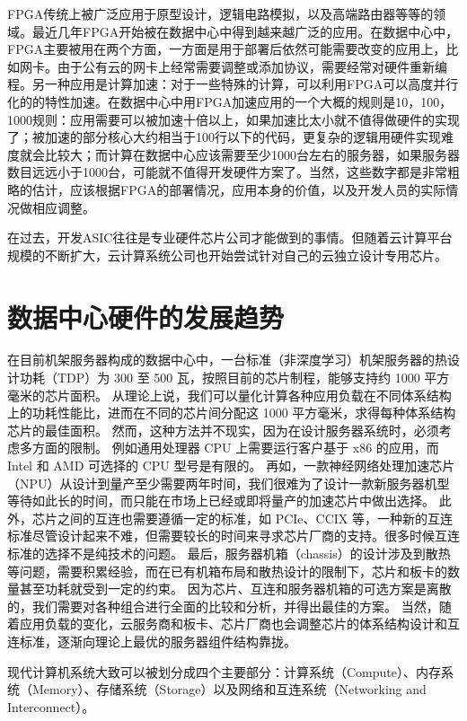 FPGA传统上被广泛应用于原型设计，逻辑电路模拟，以及高端路由器等等的领域。最近几年FPGA开始被在数据中心中得到越来越广泛的应用。在数据中心中，FPGA主要被用在两个方面，一方面是用于部署后依然可能需要改变的应用上，比如网卡。由于公有云的网卡上经常需要调整或添加协议，需要经常对硬件重新编程。另一种应用是计算加速：对于一些特殊的计算，可以利用FPGA可以高度并行化的的特性加速。在数据中心中用FPGA加速应用的一个大概的规则是10，100，1000规则：应用需要可以被加速十倍以上，如果加速比太小就不值得做硬件的实现了；被加速的部分核心大约相当于100行以下的代码，更复杂的逻辑用硬件实现难度就会比较大；而计算在数据中心应该需要至少1000台左右的服务器，如果服务器数目远远小于1000台，可能就不值得开发硬件方案了。当然，这些数字都是非常粗略的估计，应该根据FPGA的部署情况，应用本身的价值，以及开发人员的实际情况做相应调整。

在过去，开发ASIC往往是专业硬件芯片公司才能做到的事情。但随着云计算平台规模的不断扩大，云计算系统公司也开始尝试针对自己的云独立设计专用芯片。
\fi

\section{数据中心硬件的发展趋势}


在目前机架服务器构成的数据中心中，一台标准（非深度学习）机架服务器的热设计功耗（TDP）为 300 至 500 瓦，按照目前的芯片制程，能够支持约 1000 平方毫米的芯片面积。
从理论上说，我们可以量化计算各种应用负载在不同体系结构上的功耗性能比，进而在不同的芯片间分配这 1000 平方毫米，求得每种体系结构芯片的最佳面积。
然而，这种方法并不现实，因为在设计服务器系统时，必须考虑多方面的限制。
例如通用处理器 CPU 上需要运行客户基于 x86 的应用，而 Intel 和 AMD 可选择的 CPU 型号是有限的。
再如，一款神经网络处理加速芯片（NPU）从设计到量产至少需要两年时间，我们很难为了设计一款新服务器机型等待如此长的时间，而只能在市场上已经或即将量产的加速芯片中做出选择。
此外，芯片之间的互连也需要遵循一定的标准，如 PCIe、CCIX 等，一种新的互连标准尽管设计起来不难，但需要较长的时间来寻求芯片厂商的支持。很多时候互连标准的选择不是纯技术的问题。
最后，服务器机箱（chassis）的设计涉及到散热等问题，需要积累经验，而在已有机箱布局和散热设计的限制下，芯片和板卡的数量甚至功耗就受到一定的约束。
因为芯片、互连和服务器机箱的可选方案是离散的，我们需要对各种组合进行全面的比较和分析，并得出最佳的方案。
当然，随着应用负载的变化，云服务商和板卡、芯片厂商也会调整芯片的体系结构设计和互连标准，逐渐向理论上最优的服务器组件结构靠拢。

现代计算机系统大致可以被划分成四个主要部分：计算系统（Compute）、内存系统（Memory）、存储系统（Storage）以及网络和互连系统（Networking and Interconnect）。


